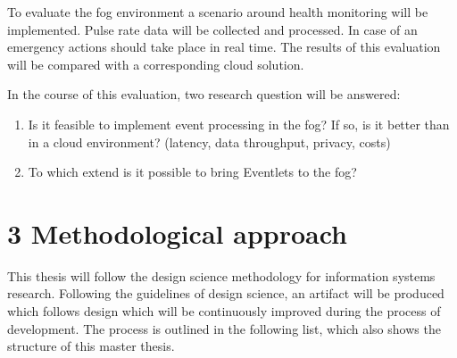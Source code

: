 \documentclass[draft,final,openany,oneside]{vutinfth} %
\begin{document}
To evaluate the fog environment a scenario around health monitoring will be implemented. Pulse rate data will be collected and processed. In case of an emergency actions should take place in real time. The results of this evaluation will be compared with a corresponding cloud solution. 

In the course of this evaluation, two research question will be answered:
\begin{enumerate}
    \item Is it feasible to implement event processing in the fog? If so, is it better than in a cloud environment? (latency, data throughput, privacy, costs)
    \item To which extend is it possible to bring Eventlets to the fog?
\end{enumerate}

\newpage
 
\chapter{3 Methodological approach}

This thesis will follow the design science methodology for information systems research. Following the guidelines of design science, an artifact will be produced which follows design which will be continuously improved during the process of development.\cite{DesignScience} \newline  
The process is outlined in the following list, which also shows the structure of this master thesis.
\end{document}
